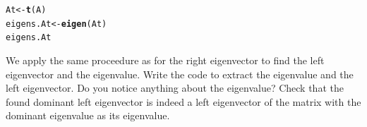 \documentclass{article}\usepackage[]{graphicx}\usepackage[]{color}
\makeatletter
\newcommand{\hlstd}[1]{\textcolor[rgb]{0.345,0.345,0.345}{#1}}%
\newcommand{\hlkwb}[1]{\textcolor[rgb]{0.69,0.353,0.396}{#1}}%
\newcommand{\hlkwd}[1]{\textcolor[rgb]{0.737,0.353,0.396}{\textbf{#1}}}%
\newenvironment{kframe}{%
 \def\at@end@of@kframe{}%
 \ifinner\ifhmode%
  \def\at@end@of@kframe{\end{minipage}}%
  \begin{minipage}{\columnwidth}%
 \fi\fi%
 \def\FrameCommand##1{\hskip\@totalleftmargin \hskip-\fboxsep
 \colorbox{shadecolor}{##1}\hskip-\fboxsep
     \hskip-\linewidth \hskip-\@totalleftmargin \hskip\columnwidth}%
 \MakeFramed {\advance\hsize-\width
   \@totalleftmargin\z@ \linewidth\hsize
   \@setminipage}}%
 {\par\unskip\endMakeFramed%
 \at@end@of@kframe}
\newenvironment{knitrout}{}{} %
\makeatother
\begin{document}
\begin{knitrout}
\color{fgcolor}\begin{kframe}
\begin{alltt}
\hlstd{At}\hlkwb{<-}\hlkwd{t}\hlstd{(A)}
\hlstd{eigens.At}\hlkwb{<-}\hlkwd{eigen}\hlstd{(At)}
\hlstd{eigens.At}
\end{alltt}
\end{kframe}
\end{knitrout}
We apply the same proceedure as for the right eigenvector to find the left eigenvector and the eigenvalue. Write the code to extract the eigenvalue and the left eigenvector. Do you notice anything about the eigenvalue? Check that the found dominant left eigenvector is indeed a left eigenvector of the matrix with the dominant eigenvalue as its eigenvalue.\\[1.5ex]
\end{document}
